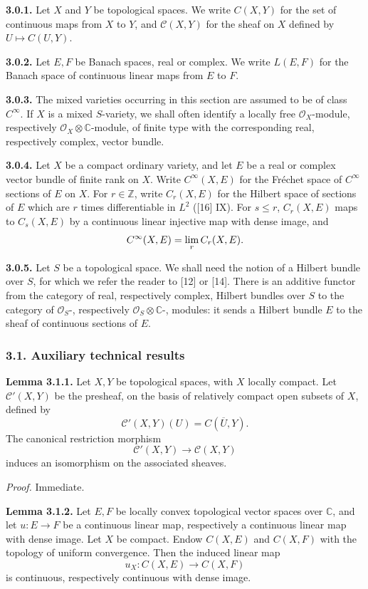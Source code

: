 \documentclass[11pt]{article}
\begin{document}
\textbf{3.0.1.} Let $X$ and $Y$ be topological spaces. We write $C(X,Y)$ for the set of continuous maps from $X$ to $Y$, and $\mathcal C(X,Y)$ for the sheaf on $X$ defined by $U\mapsto C(U,Y)$.

\textbf{3.0.2.} Let $E,F$ be Banach spaces, real or complex. We write $L(E,F)$ for the Banach space of continuous linear maps from $E$ to $F$.

\textbf{3.0.3.} The mixed varieties occurring in this section are assumed to be of class $C^\infty$. If $X$ is a mixed $S$-variety, we shall often identify a locally free $\mathcal O_X$-module, respectively $\mathcal O_X\otimes\mathbb C$-module, of finite type with the corresponding real, respectively complex, vector bundle.

\textbf{3.0.4.} Let $X$ be a compact ordinary variety, and let $E$ be a real or complex vector bundle of finite rank on $X$. Write $C^\infty(X,E)$ for the Fréchet space of $C^\infty$ sections of $E$ on $X$. For $r\in\mathbb Z$, write $C_r(X,E)$ for the Hilbert space of sections of $E$ which are $r$ times differentiable in $L^2$ ([16] IX). For $s\le r$, $C_r(X,E)$ maps to $C_s(X,E)$ by a continuous linear injective map with dense image, and
\[
 C^\infty(X,E)=\operatorname*{lim}_r C_r(X,E).
\]

\textbf{3.0.5.} Let $S$ be a topological space. We shall need the notion of a Hilbert bundle over $S$, for which we refer the reader to [12] or [14]. There is an additive functor from the category of real, respectively complex, Hilbert bundles over $S$ to the category of $\mathcal O_S$-, respectively $\mathcal O_S\otimes\mathbb C$-, modules: it sends a Hilbert bundle $E$ to the sheaf of continuous sections of $E$.

\subsubsection*{3.1. Auxiliary technical results}

\textbf{Lemma 3.1.1.} Let $X,Y$ be topological spaces, with $X$ locally compact. Let $\mathcal C'(X,Y)$ be the presheaf, on the basis of relatively compact open subsets of $X$, defined by
\[
 \mathcal C'(X,Y)(U)=C(\overline U,Y).
\]
The canonical restriction morphism
\[
 \mathcal C'(X,Y)\longrightarrow \mathcal C(X,Y)
\]
induces an isomorphism on the associated sheaves.

\emph{Proof.} Immediate.

\textbf{Lemma 3.1.2.} Let $E,F$ be locally convex topological vector spaces over $\mathbb C$, and let $u:E\to F$ be a continuous linear map, respectively a continuous linear map with dense image. Let $X$ be compact. Endow $C(X,E)$ and $C(X,F)$ with the topology of uniform convergence. Then the induced linear map
\[
 u_X:C(X,E)\longrightarrow C(X,F)
\]
is continuous, respectively continuous with dense image.
\end{document}
